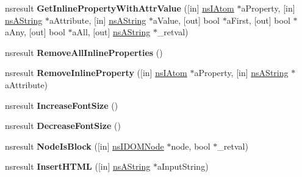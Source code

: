 \begin{DoxyCompactItemize}
\item 
\mbox{\label{interfacens_i_h_t_m_l_editor_a9c93a9822bee40a60d697e552bc204c8}} 
nsresult {\bfseries Get\+Inline\+Property\+With\+Attr\+Value} (\mbox{[}in\mbox{]} \hyperlink{interfacens_i_supports}{ns\+I\+Atom} $\ast$a\+Property, \mbox{[}in\mbox{]} \hyperlink{structns_string_container}{ns\+A\+String} $\ast$a\+Attribute, \mbox{[}in\mbox{]} \hyperlink{structns_string_container}{ns\+A\+String} $\ast$a\+Value, \mbox{[}out\mbox{]} bool $\ast$a\+First, \mbox{[}out\mbox{]} bool $\ast$a\+Any, \mbox{[}out\mbox{]} bool $\ast$a\+All, \mbox{[}out\mbox{]} \hyperlink{structns_string_container}{ns\+A\+String} $\ast$\+\_\+retval)
\item 
\mbox{\label{interfacens_i_h_t_m_l_editor_a0774015c8e3b6e97a8671d0c78e92427}} 
nsresult {\bfseries Remove\+All\+Inline\+Properties} ()
\item 
\mbox{\label{interfacens_i_h_t_m_l_editor_a0712c3423ab959a1430e7f62abeae2f8}} 
nsresult {\bfseries Remove\+Inline\+Property} (\mbox{[}in\mbox{]} \hyperlink{interfacens_i_supports}{ns\+I\+Atom} $\ast$a\+Property, \mbox{[}in\mbox{]} \hyperlink{structns_string_container}{ns\+A\+String} $\ast$a\+Attribute)
\item 
\mbox{\label{interfacens_i_h_t_m_l_editor_ae96a6d9a264421941713fca76f42c765}} 
nsresult {\bfseries Increase\+Font\+Size} ()
\item 
\mbox{\label{interfacens_i_h_t_m_l_editor_aea619fcdf4a1ab5b479f10938d8fa10b}} 
nsresult {\bfseries Decrease\+Font\+Size} ()
\item 
\mbox{\label{interfacens_i_h_t_m_l_editor_a0a7fff18c479ea5ab7f17b876fb93ba6}} 
nsresult {\bfseries Node\+Is\+Block} (\mbox{[}in\mbox{]} \hyperlink{interfacens_i_d_o_m_node}{ns\+I\+D\+O\+M\+Node} $\ast$node, bool $\ast$\+\_\+retval)
\item 
\mbox{\label{interfacens_i_h_t_m_l_editor_a71e86beece8a8c1dad0f808cc631d8a5}} 
nsresult {\bfseries Insert\+H\+T\+ML} (\mbox{[}in\mbox{]} \hyperlink{structns_string_container}{ns\+A\+String} $\ast$a\+Input\+String)

\end{DoxyCompactItemize}
